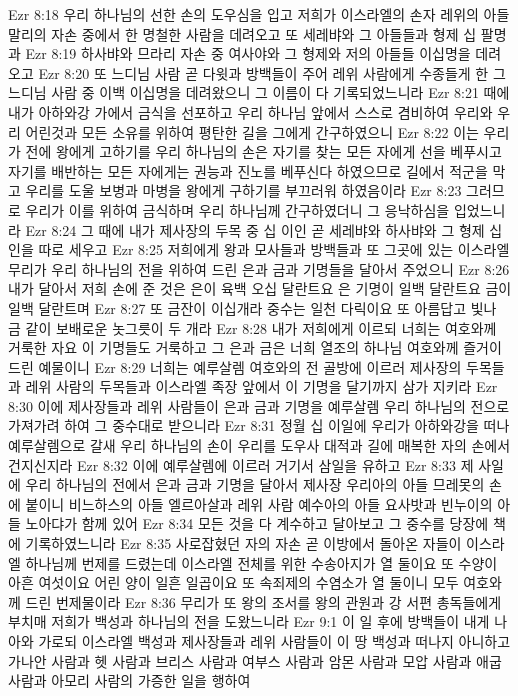 Ezr 8:18  우리 하나님의 선한 손의 도우심을 입고 저희가 이스라엘의 손자 레위의 아들 말리의 자손 중에서 한 명철한 사람을 데려오고 또 세레뱌와 그 아들들과 형제 십 팔명과
Ezr 8:19  하사뱌와 므라리 자손 중 여사야와 그 형제와 저의 아들들 이십명을 데려오고
Ezr 8:20  또 느디님 사람 곧 다윗과 방백들이 주어 레위 사람에게 수종들게 한 그 느디님 사람 중 이백 이십명을 데려왔으니 그 이름이 다 기록되었느니라
Ezr 8:21  때에 내가 아하와강 가에서 금식을 선포하고 우리 하나님 앞에서 스스로 겸비하여 우리와 우리 어린것과 모든 소유를 위하여 평탄한 길을 그에게 간구하였으니
Ezr 8:22  이는 우리가 전에 왕에게 고하기를 우리 하나님의 손은 자기를 찾는 모든 자에게 선을 베푸시고 자기를 배반하는 모든 자에게는 권능과 진노를 베푸신다 하였으므로 길에서 적군을 막고 우리를 도울 보병과 마병을 왕에게 구하기를 부끄러워 하였음이라
Ezr 8:23  그러므로 우리가 이를 위하여 금식하며 우리 하나님께 간구하였더니 그 응낙하심을 입었느니라
Ezr 8:24  그 때에 내가 제사장의 두목 중 십 이인 곧 세레뱌와 하사뱌와 그 형제 십인을 따로 세우고
Ezr 8:25  저희에게 왕과 모사들과 방백들과 또 그곳에 있는 이스라엘 무리가 우리 하나님의 전을 위하여 드린 은과 금과 기명들을 달아서 주었으니
Ezr 8:26  내가 달아서 저희 손에 준 것은 은이 육백 오십 달란트요 은 기명이 일백 달란트요 금이 일백 달란트며
Ezr 8:27  또 금잔이 이십개라 중수는 일천 다릭이요 또 아름답고 빛나 금 같이 보배로운 놋그릇이 두 개라
Ezr 8:28  내가 저희에게 이르되 너희는 여호와께 거룩한 자요 이 기명들도 거룩하고 그 은과 금은 너희 열조의 하나님 여호와께 즐거이 드린 예물이니
Ezr 8:29  너희는 예루살렘 여호와의 전 골방에 이르러 제사장의 두목들과 레위 사람의 두목들과 이스라엘 족장 앞에서 이 기명을 달기까지 삼가 지키라
Ezr 8:30  이에 제사장들과 레위 사람들이 은과 금과 기명을 예루살렘 우리 하나님의 전으로 가져가려 하여 그 중수대로 받으니라
Ezr 8:31  정월 십 이일에 우리가 아하와강을 떠나 예루살렘으로 갈새 우리 하나님의 손이 우리를 도우사 대적과 길에 매복한 자의 손에서 건지신지라
Ezr 8:32  이에 예루살렘에 이르러 거기서 삼일을 유하고
Ezr 8:33  제 사일에 우리 하나님의 전에서 은과 금과 기명을 달아서 제사장 우리아의 아들 므레못의 손에 붙이니 비느하스의 아들 엘르아살과 레위 사람 예수아의 아들 요사밧과 빈누이의 아들 노아댜가 함께 있어
Ezr 8:34  모든 것을 다 계수하고 달아보고 그 중수를 당장에 책에 기록하였느니라
Ezr 8:35  사로잡혔던 자의 자손 곧 이방에서 돌아온 자들이 이스라엘 하나님께 번제를 드렸는데 이스라엘 전체를 위한 수송아지가 열 둘이요 또 수양이 아흔 여섯이요 어린 양이 일흔 일곱이요 또 속죄제의 수염소가 열 둘이니 모두 여호와께 드린 번제물이라
Ezr 8:36  무리가 또 왕의 조서를 왕의 관원과 강 서편 총독들에게 부치매 저희가 백성과 하나님의 전을 도왔느니라
Ezr 9:1  이 일 후에 방백들이 내게 나아와 가로되 이스라엘 백성과 제사장들과 레위 사람들이 이 땅 백성과 떠나지 아니하고 가나안 사람과 헷 사람과 브리스 사람과 여부스 사람과 암몬 사람과 모압 사람과 애굽 사람과 아모리 사람의 가증한 일을 행하여

